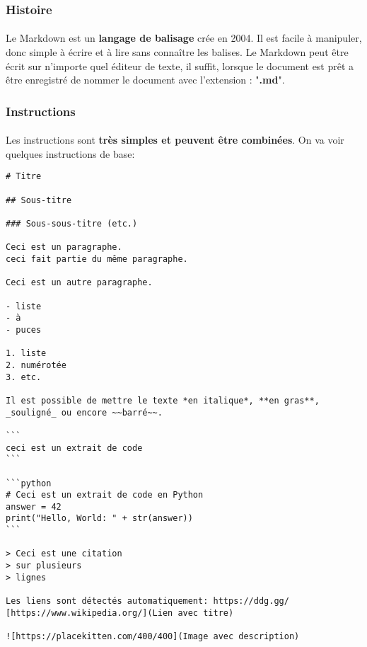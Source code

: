 \subsubsection{Histoire}

\paragraph{} Le Markdown est un \textbf{langage de balisage} crée en 2004. Il
est facile à manipuler, donc simple à écrire et à lire sans connaître les
balises. Le Markdown peut être écrit sur n'importe quel éditeur de texte, il
suffit, lorsque le document est prêt a être enregistré de nommer le document
avec l'extension : "\textbf{.md}".

\subsubsection{Instructions}

\paragraph{} Les instructions sont \textbf{très simples et peuvent être
combinées}. On va voir quelques instructions de base:

\begin{verbatim}
# Titre

## Sous-titre

### Sous-sous-titre (etc.)

Ceci est un paragraphe.
ceci fait partie du même paragraphe.

Ceci est un autre paragraphe.

- liste
- à
- puces

1. liste
2. numérotée
3. etc.

Il est possible de mettre le texte *en italique*, **en gras**,
_souligné_ ou encore ~~barré~~.

```
ceci est un extrait de code
```

```python
# Ceci est un extrait de code en Python
answer = 42
print("Hello, World: " + str(answer))
```

> Ceci est une citation
> sur plusieurs
> lignes

Les liens sont détectés automatiquement: https://ddg.gg/
[https://www.wikipedia.org/](Lien avec titre)

![https://placekitten.com/400/400](Image avec description)
\end{verbatim}
